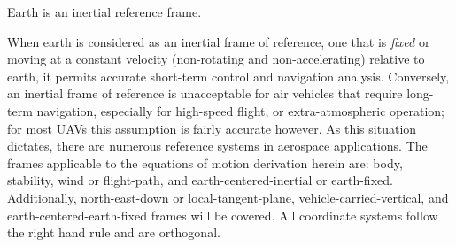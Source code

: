 \documentclass[12pt]{ucthesis}
\begin{document}
	\begin{ass}
	Earth is an inertial reference frame.
	\label{ass: inertial}
	\end{ass}

\noindent When earth is considered as an inertial frame of reference, one that is \textit{fixed} or moving at a constant velocity (non-rotating and non-accelerating) relative to earth, it permits accurate short-term control and navigation analysis. Conversely, an inertial frame of reference is unacceptable for air vehicles that require long-term navigation, especially for high-speed flight, or extra-atmospheric operation; for most UAVs this assumption is fairly accurate however. As this situation dictates, there are numerous reference systems in aerospace applications. The frames applicable to the equations of motion derivation herein are: body, stability, wind or flight-path, and earth-centered-inertial or earth-fixed. Additionally, north-east-down or local-tangent-plane, vehicle-carried-vertical, and earth-centered-earth-fixed frames will be covered. All coordinate systems follow the right hand rule and are orthogonal.
%
\end{document}
